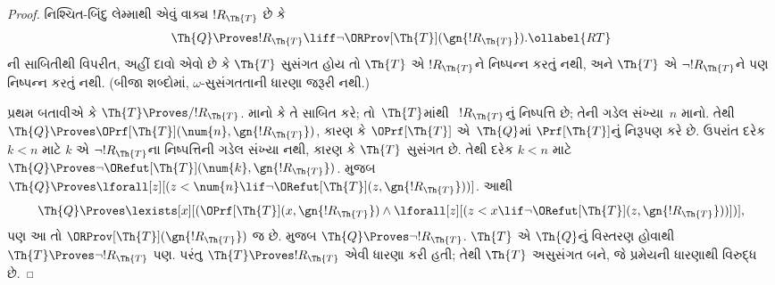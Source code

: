 \begin{proof}
નિશ્ચિત-બિંદુ લેમ્માથી એવું
વાક્ય $!R_\Th{T}$ છે કે
\begin{equation}
  \Th{Q} \Proves !R_\Th{T} \liff \lnot \ORProv[\Th{T}](\gn{!R_\Th{T}}).
  \ollabel{RT}
\end{equation}
ની
સાબિતીથી વિપરીત, અહીં
દાવો એવો છે કે
$\Th{T}$ સુસંગત હોય તો
$\Th{T}$ એ $!R_\Th{T}$ને
નિષ્પન્ન કરતું નથી,
અને $\Th{T}$ એ
$\lnot !R_\Th{T}$ને પણ
નિષ્પન્ન કરતું નથી.
(બીજા શબ્દોમાં,
$\omega$-સુસંગતતાની
ધારણા જરૂરી નથી.)

પ્રથમ બતાવીએ કે
$\Th{T} \Proves/ !R_{\Th{T}}$.
માનો કે તે સાબિત કરે;
તો~$\Th{T}$માંથી
~$!R_{\Th{T}}$નું
નિષ્પત્તિ છે;
તેની ગડેલ સંખ્યા~$n$
માનો. તેથી
$\Th{Q} \Proves \OPrf[\Th{T}](\num{n}, \gn{!R_{\Th{T}}})$,
કારણ કે $\OPrf[\Th{T}]$
એ~$\Th{Q}$માં
$\Prf[\Th{T}]$નું નિરૂપણ
કરે છે. ઉપરાંત દરેક
$k < n$ માટે $k$ એ
$\lnot !R_{\Th{T}}$ના
નિષ્પત્તિની ગડેલ
સંખ્યા નથી, કારણ કે
$\Th{T}$ સુસંગત છે.
તેથી દરેક $k < n$ માટે
$\Th{Q} \Proves \lnot
\ORefut[\Th{T}](\num{k}, \gn{!R_{\Th{T}}})$.
મુજબ
$\Th{Q} \Proves \lforall[z][(z < \num{n} \lif \lnot \ORefut[\Th{T}](z,
  \gn{!R_{\Th{T}}}))]$.
આથી
\[
\Th{Q} \Proves \lexists[x][(\OPrf[\Th{T}](x,\gn{!R_{\Th{T}}}) \land \lforall[z][(z
    < x \lif \lnot \ORefut[\Th{T}](z,\gn{!R_{\Th{T}}}))])],
\]
પણ આ તો
$\ORProv[\Th{T}](\gn{!R_{\Th{T}}})$
જ છે.  મુજબ
$\Th{Q}
\Proves \lnot !R_{\Th{T}}$.
$\Th{T}$ એ $\Th{Q}$નું
વિસ્તરણ હોવાથી
$\Th{T}
\Proves \lnot !R_{\Th{T}}$
પણ. પરંતુ
$\Th{T} \Proves !R_{\Th{T}}$
એવી ધારણા કરી હતી;
તેથી $\Th{T}$ અસુસંગત
બને, જે પ્રમેયની
ધારણાથી વિરુદ્ધ છે.


\end{proof}
